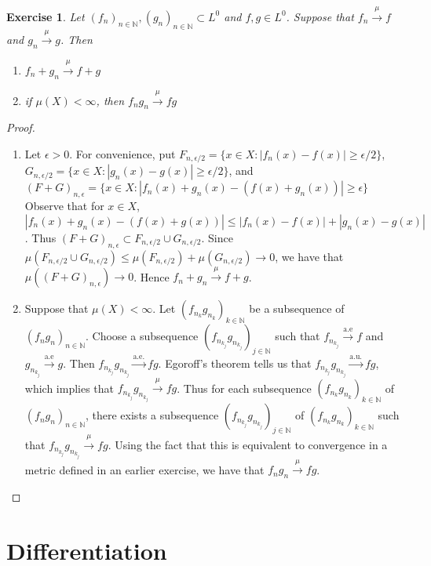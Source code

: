 \documentclass[12pt]{amsart}
\newtheorem{ex}[thm]{Exercise}
\newcommand{\ep}{\epsilon}
\newcommand{\N}{\mathbb{N}}
\newcommand{\convt}[1]{\xrightarrow{\text{#1}}}
\newcommand{\conv}[1]{\xrightarrow{#1}}
\begin{document}
\begin{ex}
Let $(f_n)_{n \in \N}, (g_n)_{n \in \N} \subset L^0$ and $f,g \in L^0$. Suppose that $f_n \conv{\mu} f$ and $g_n \conv{\mu}g$. Then 
\begin{enumerate}
\item $f_n + g_n \conv{\mu} f+g$
\item if $\mu(X) < \infty$, then $f_n g_n \conv{\mu} fg$
\end{enumerate}
\end{ex}

\begin{proof}

\begin{enumerate}
\item Let $\ep > 0$. For convenience, put $F_{n,\ep/2} = \{x \in X: |f_n(x) - f(x)| \geq \ep/2\}$, $G_{n, \ep/2} = \{x \in X: |g_n(x) - g(x)| \geq \ep/2\}$, and $(F+G)_{n,\ep} = \{x \in X: |f_n(x)+g_n(x) - (f(x) + g_n(x))| \geq \ep\}$ Observe that for $x \in X$, $|f_n(x) + g_n(x) - (f(x) + g(x))| \leq |f_n(x) - f(x)| + |g_n(x) - g(x)|$. Thus $(F+G)_{n,\ep} \subset F_{n,\ep/2} \cup G_{n, \ep/2}$. Since $\mu(F_{n,\ep/2} \cup G_{n, \ep/2}) \leq \mu(F_{n,\ep/2}) + \mu(G_{n, \ep/2}) \rightarrow 0$, we have that $\mu((F+G)_{n,\ep}) \rightarrow 0$. Hence $f_n + g_n \conv{\mu} f+g$.

\item Suppose that $\mu(X) < \infty$. Let $(f_{n_k}g_{n_k})_{k \in \N}$ be a subsequence of $(f_ng_n)_{n \in \N}$. Choose a subsequence $(f_{n_{k_j}}g_{n_{k_j}})_{j \in \N}$ such that $f_{n_{k_j}} \convt{a.e} f$ and $g_{n_{k_j}} \convt{a.e} g$. Then $f_{n_{k_j}}g_{n_{k_j}} \convt{a.e.} fg$. Egoroff's theorem tells us that $f_{n_{k_j}}g_{n_{k_j}} \convt{a.u.} fg$, which implies that $f_{n_{k_j}}g_{n_{k_j}} \conv{\mu} fg$. Thus for each subsequence $(f_{n_k}g_{n_k})_{k \in \N}$ of $(f_ng_n)_{n \in \N}$, there exists a subsequence $(f_{n_{k_j}}g_{n_{k_j}})_{j \in \N}$ of $(f_{n_k}g_{n_k})_{k \in \N}$ such that $f_{n_{k_j}}g_{n_{k_j}} \conv{\mu} fg$. Using the fact that this is equivalent to convergence in a metric defined in an earlier exercise,
we have that $f_ng_n \conv{\mu} fg$.
\end{enumerate}

\end{proof}

\section{Differentiation}
\end{document}

